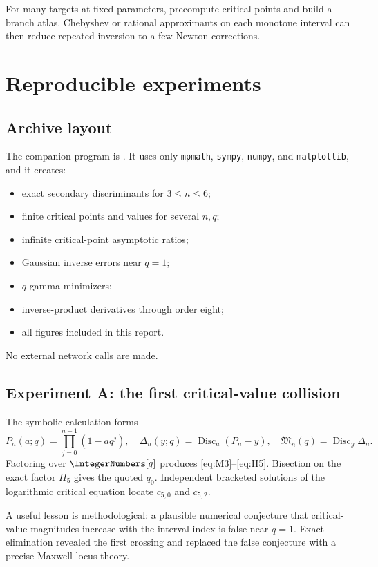 \documentclass[11pt,oneside]{article}
\theoremstyle{definition}
\theoremstyle{remark}
\theoremstyle{plain}
\theoremstyle{definition}
\theoremstyle{remark}
\newcommand{\Disc}{\operatorname{Disc}}
\numberwithin{equation}{section}
\numberwithin{figure}{section}
\numberwithin{table}{section}
\let\reporttopsection\section
\let\reportsubsection\subsection
\let\reportsubsubsection\subsubsection
\let\chapter\reporttopsection
\let\section\reportsubsection
\let\subsection\reportsubsubsection
\begin{document}
For many targets at fixed parameters, precompute critical points and build a
branch atlas.  Chebyshev or rational approximants on each monotone interval can
then reduce repeated inversion to a few Newton corrections.

\chapter{Reproducible experiments}

\section{Archive layout}
The companion program is .  It uses only
\texttt{mpmath}, \texttt{sympy}, \texttt{numpy}, and \texttt{matplotlib},
and it creates:
\begin{itemize}
\item exact secondary discriminants for \(3\le n\le6\);
\item finite critical points and values for several \(n,q\);
\item infinite critical-point asymptotic ratios;
\item Gaussian inverse errors near \(q=1\);
\item \(q\)-gamma minimizers;
\item inverse-product derivatives through order eight;
\item all figures included in this report.
\end{itemize}
No external network calls are made.

\section{Experiment A: the first critical-value collision}
The symbolic calculation forms
\[
 P_n(a;q)=\prod_{j=0}^{n-1}(1-aq^j),
\quad
 \Delta_n(y;q)=\Disc_a(P_n-y),
\quad
 \mathfrak M_n(q)=\Disc_y\Delta_n.
\]
Factoring over \(\IntegerNumbers[q]\) produces \eqref{eq:M3}--\eqref{eq:H5}.  Bisection on
the exact factor \(H_5\) gives the quoted \(q_0\).  Independent bracketed
solutions of the logarithmic critical equation locate \(c_{5,0}\) and
\(c_{5,2}\).

A useful lesson is methodological: a plausible numerical conjecture that
critical-value magnitudes increase with the interval index is false near
\(q=1\).  Exact elimination revealed the first crossing and replaced the false
conjecture with a precise Maxwell-locus theory.
\end{document}
